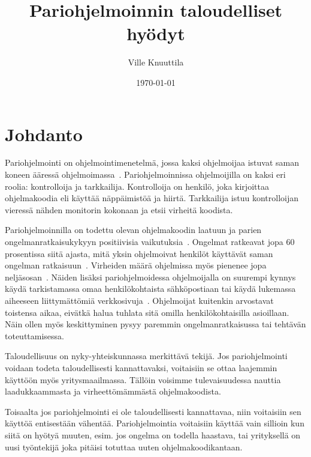 \documentclass[finnish]{tktltiki2}
\title{Pariohjelmoinnin taloudelliset hyödyt}
\author{Ville Knuuttila}
\date{\today}
\theoremstyle{definition}
\theoremstyle{remark}
\begin{document}

\maketitle        %
\makeabstract     %

\tableofcontents  %
\newpage          %



\section{Johdanto}

Pariohjelmointi on ohjelmointimenetelmä, jossa kaksi ohjelmoijaa istuvat saman koneen ääressä ohjelmoimassa~\cite{pairprogramming2}. Pariohjelmoinnissa ohjelmoijilla on kaksi eri roolia: kontrolloija ja tarkkailija. Kontrolloija on henkilö, joka kirjoittaa ohjelmakoodia eli käyttää näppäimistöä ja hiirtä. Tarkkailija istuu kontrolloijan vieressä nähden monitorin kokonaan ja etsii virheitä koodista. 


Pariohjelmoinnilla on todettu olevan ohjelmakoodin laatuun ja parien ongelmanratkaisukykyyn positiivisia vaikutuksia~\cite{pairprogramming}. Ongelmat ratkeavat jopa 60 prosentissa siitä ajasta, mitä yksin ohjelmoivat henkilöt käyttävät saman ongelman ratkaisuun~\cite{meta}. Virheiden määrä ohjelmissa myös pienenee jopa neljäsosan~\cite{williams00str}. Näiden lisäksi pariohjelmoidessa ohjelmoijalla on suurempi kynnys käydä tarkistamassa omaa henkilökohtaista sähköpostiaan tai käydä lukemassa aiheeseen liittymättömiä verkkosivuja~\cite{williams03pair}. Ohjelmoijat kuitenkin arvostavat toistensa aikaa, eivätkä halua tuhlata sitä omilla henkilökohtaisilla asioillaan. Näin ollen myös keskittyminen pysyy paremmin ongelmanratkaisussa tai tehtävän toteuttamisessa.

Taloudellisuus on nyky-yhteiskunnassa merkittävä tekijä. Jos pariohjelmointi voidaan todeta taloudellisesti kannattavaksi, voitaisiin se ottaa laajemmin käyttöön myös yritysmaailmassa. Tällöin voisimme tulevaisuudessa nauttia laadukkaammasta ja virheettömämmästä ohjelmakoodista.

Toisaalta jos pariohjelmointi ei ole taloudellisesti kannattavaa, niin voitaisiin sen käyttöä entisestään vähentää. Pariohjelmointia voitaisiin käyttää vain sillioin kun siitä on hyötyä muuten, esim. jos ongelma on todella haastava, tai yrityksellä on uusi työntekijä joka pitäisi totuttaa uuten ohjelmakoodikantaan.
\end{document}
